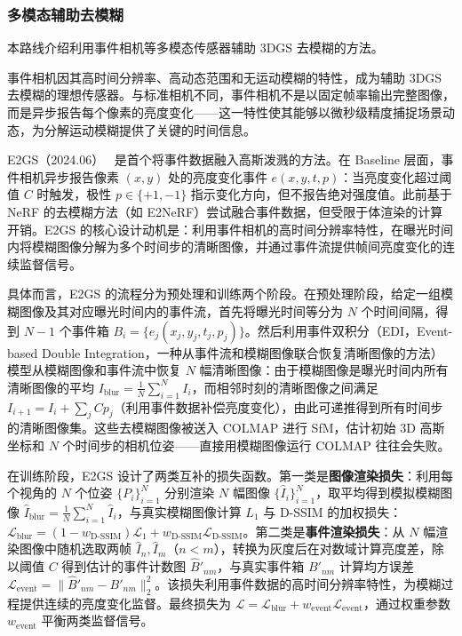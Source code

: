 \subsubsection{多模态辅助去模糊}

本路线介绍利用事件相机等多模态传感器辅助 3DGS 去模糊的方法。

事件相机因其高时间分辨率、高动态范围和无运动模糊的特性，成为辅助 3DGS 去模糊的理想传感器。与标准相机不同，事件相机不是以固定帧率输出完整图像，而是异步报告每个像素的亮度变化——这一特性使其能够以微秒级精度捕捉场景动态，为分解运动模糊提供了关键的时间信息。

E2GS（2024.06）~\cite{2406_14978} 是首个将事件数据融入高斯泼溅的方法。在 Baseline 层面，事件相机异步报告像素 $(x,y)$ 处的亮度变化事件 $e(x,y,t,p)$：当亮度变化超过阈值 $C$ 时触发，极性 $p \in \{+1, -1\}$ 指示变化方向，但不报告绝对强度值。此前基于 NeRF 的去模糊方法（如 E2NeRF）尝试融合事件数据，但受限于体渲染的计算开销。E2GS 的核心设计动机是：利用事件相机的高时间分辨率特性，在曝光时间内将模糊图像分解为多个时间步的清晰图像，并通过事件流提供帧间亮度变化的连续监督信号。

具体而言，E2GS 的流程分为预处理和训练两个阶段。在预处理阶段，给定一组模糊图像及其对应曝光时间内的事件流，首先将曝光时间等分为 $N$ 个时间间隔，得到 $N-1$ 个事件箱 $B_i = \{e_j(x_j, y_j, t_j, p_j)\}$。然后利用事件双积分（EDI，Event-based Double Integration，一种从事件流和模糊图像联合恢复清晰图像的方法）模型从模糊图像和事件流中恢复 $N$ 幅清晰图像：由于模糊图像是曝光时间内所有清晰图像的平均 $I_\text{blur} = \frac{1}{N}\sum_{i=1}^{N} I_i$，而相邻时刻的清晰图像之间满足 $I_{i+1} = I_i + \sum_j C p_j$（利用事件数据补偿亮度变化），由此可递推得到所有时间步的清晰图像集。这些去模糊图像被送入 COLMAP 进行 SfM，估计初始 3D 高斯坐标和 $N$ 个时间步的相机位姿——直接用模糊图像运行 COLMAP 往往会失败。

在训练阶段，E2GS 设计了两类互补的损失函数。第一类是\textbf{图像渲染损失}：利用每个视角的 $N$ 个位姿 $\{P_i\}_{i=1}^N$ 分别渲染 $N$ 幅图像 $\{\hat{I}_i\}_{i=1}^N$，取平均得到模拟模糊图像 $\hat{I}_\text{blur} = \frac{1}{N}\sum_{i=1}^N \hat{I}_i$，与真实模糊图像计算 $L_1$ 与 D-SSIM 的加权损失：$\mathcal{L}_\text{blur} = (1-w_\text{D-SSIM})\mathcal{L}_1 + w_\text{D-SSIM}\mathcal{L}_\text{D-SSIM}$。第二类是\textbf{事件渲染损失}：从 $N$ 幅渲染图像中随机选取两帧 $\hat{I}_n, \hat{I}_m$（$n < m$），转换为灰度后在对数域计算亮度差，除以阈值 $C$ 得到估计的事件计数图 $\hat{B}'_{nm}$，与真实事件箱 $B'_{nm}$ 计算均方误差 $\mathcal{L}_\text{event} = \|\hat{B}'_{nm} - B'_{nm}\|_2^2$。该损失利用事件数据的高时间分辨率特性，为模糊过程提供连续的亮度变化监督。最终损失为 $\mathcal{L} = \mathcal{L}_\text{blur} + w_\text{event}\mathcal{L}_\text{event}$，通过权重参数 $w_\text{event}$ 平衡两类监督信号。

